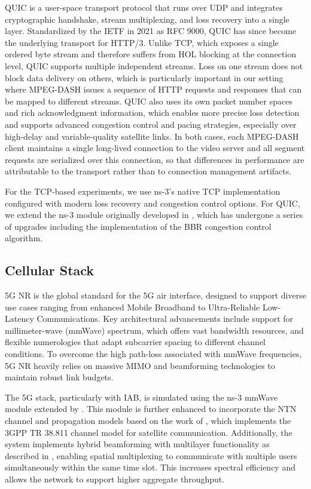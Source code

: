 \documentclass[journal]{IEEEtran}
\begin{document}
QUIC is a user-space transport protocol that runs over UDP and integrates cryptographic handshake, stream multiplexing, and loss recovery into a single layer. Standardized by the IETF in 2021 as RFC 9000, QUIC has since become the underlying transport for HTTP/3. Unlike TCP, which exposes a single ordered byte stream and therefore suffers from HOL blocking at the connection level, QUIC supports multiple independent streams. Loss on one stream does not block data delivery on others, which is particularly important in our setting where MPEG-DASH issues a sequence of HTTP requests and responses that can be mapped to different streams. QUIC also uses its own packet number spaces and rich acknowledgment information, which enables more precise loss detection and supports advanced congestion control and pacing strategies, especially over high-delay and variable-quality satellite links. In both cases, each MPEG-DASH client maintains a single long-lived connection to the video server and all segment requests are serialized over this connection, so that differences in performance are attributable to the transport rather than to connection management artifacts.

For the TCP-based experiments, we use ns-3's native TCP implementation configured with modern loss recovery and congestion control options. For QUIC, we extend the ns-3 module originally developed in \cite{DeBiasio2019}, which has undergone a series of upgrades including the implementation of the BBR congestion control algorithm.

\subsection*{Cellular Stack}

5G NR is the global standard for the 5G air interface, designed to support diverse use cases ranging from enhanced Mobile Broadband to Ultra-Reliable Low-Latency Communications. Key architectural advancements include support for millimeter-wave (mmWave) spectrum, which offers vast bandwidth resources, and flexible numerologies that adapt subcarrier spacing to different channel conditions. To overcome the high path-loss associated with mmWave frequencies, 5G NR heavily relies on massive MIMO and beamforming technologies to maintain robust link budgets.

The 5G stack, particularly with IAB, is simulated using the ns-3 mmWave module extended by \cite{Polese2018}. This module is further enhanced to incorporate the NTN channel and propagation models based on the work of \cite{Sandri2023}, which implements the 3GPP TR 38.811 channel model for satellite communication. Additionally, the system implements hybrid beamforming with multilayer functionality as described in \cite{Polese2020HBF}, enabling spatial multiplexing to communicate with multiple users simultaneously within the same time slot. This increases spectral efficiency and allows the network to support higher aggregate throughput.
\end{document}

